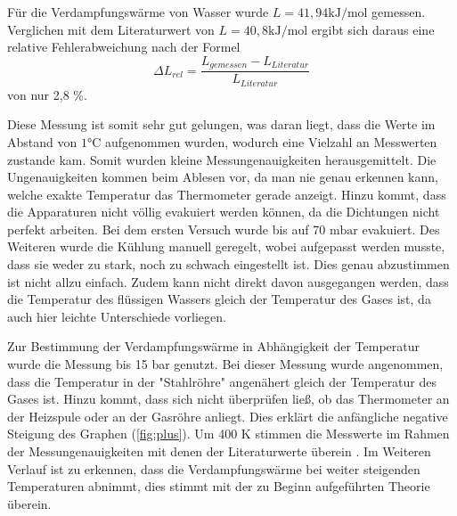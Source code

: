 Für die Verdampfungswärme von Wasser wurde $L = 41,94 \si{\kilo \joule \per \mol}$
gemessen. Verglichen mit dem Literaturwert von $L = 40,8 \si{\kilo \joule \per \mol}$
\cite{chemie} ergibt sich daraus eine relative Fehlerabweichung nach der Formel
\begin{equation}
  \Delta L_{rel} = \frac{L_{gemessen}-L_{Literatur}}{L_{Literatur}}
\end{equation}
von nur 2,8 \%.

Diese Messung ist somit sehr gut gelungen, was daran liegt, dass die
Werte im Abstand von $1 \si{\celsius}$ aufgenommen wurden, wodurch eine Vielzahl
an Messwerten zustande kam. Somit wurden kleine Messungenauigkeiten herausgemittelt.
Die Ungenauigkeiten kommen beim Ablesen vor, da man nie genau erkennen kann, welche
exakte Temperatur das Thermometer gerade anzeigt. Hinzu kommt, dass die Apparaturen
nicht völlig evakuiert werden können, da die Dichtungen nicht perfekt arbeiten. Bei
dem ersten Versuch wurde bis auf 70 $\si{\milli \bar}$ evakuiert. Des Weiteren
wurde die Kühlung manuell geregelt, wobei aufgepasst werden musste, dass sie weder
zu stark, noch zu schwach eingestellt ist. Dies genau abzustimmen ist nicht
allzu einfach. Zudem kann nicht direkt davon ausgegangen werden, dass die Temperatur
des flüssigen Wassers gleich der Temperatur des Gases ist, da auch hier leichte
Unterschiede vorliegen.

Zur Bestimmung der Verdampfungswärme in Abhängigkeit der Temperatur wurde die Messung
bis 15 bar genutzt. Bei dieser Messung wurde angenommen, dass die Temperatur in
der "Stahlröhre" angenähert gleich der Temperatur des Gases ist. Hinzu kommt, dass
sich nicht überprüfen ließ, ob das Thermometer an der Heizspule oder an der Gasröhre
anliegt. Dies erklärt die anfängliche negative Steigung des Graphen (\ref{fig:plus}).
Um 400 $\si{\kelvin}$ stimmen die Messwerte im Rahmen der Messungenauigkeiten
mit denen der Literaturwerte überein \cite{chemie}. Im Weiteren Verlauf ist zu erkennen,
dass die Verdampfungswärme bei weiter steigenden Temperaturen abnimmt, dies stimmt mit der
zu Beginn aufgeführten Theorie überein.
